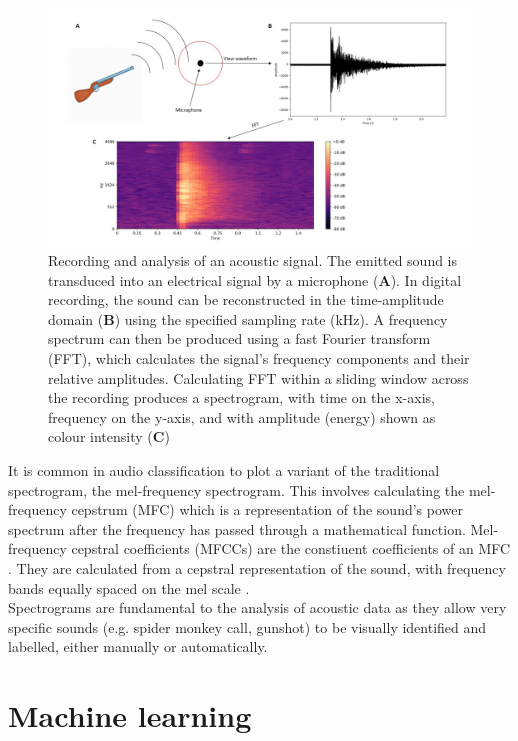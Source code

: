 \begin{figure}
\includegraphics[width=1.2\textwidth,center]{Figures/audio_analysis}\caption[Analysis of acoustic data]{Recording and analysis of an acoustic signal. The emitted sound is transduced into an electrical signal by a microphone (\textbf{A}). In digital recording, the sound can be reconstructed in the time-amplitude domain (\textbf{B}) using the specified sampling rate (kHz). A frequency spectrum can then be produced using a fast Fourier transform (FFT), which calculates the signal’s frequency components and their relative amplitudes. Calculating FFT within a sliding window across the recording produces a spectrogram, with time on the x-axis, frequency on the y-axis, and with amplitude (energy) shown as colour intensity (\textbf{C})}\label{fig:audio_analysis}
\end{figure}


\noindent It is common in audio classification to plot a variant of the traditional spectrogram, the mel-frequency spectrogram. This involves calculating the mel-frequency cepstrum (MFC) which is a representation of the sound's power spectrum after the frequency has passed through a mathematical function. Mel-frequency cepstral coefficients (MFCCs) are the constiuent coefficients of an MFC \citep{Xu2004}. They are calculated from a cepstral representation of the sound, with frequency bands equally spaced on the mel scale \citep{Stevens1937}. \\


\noindent Spectrograms are fundamental to the analysis of acoustic data as they allow very specific sounds (e.g. spider monkey call, gunshot) to be visually identified and labelled, either manually or automatically.

\section{Machine learning}

